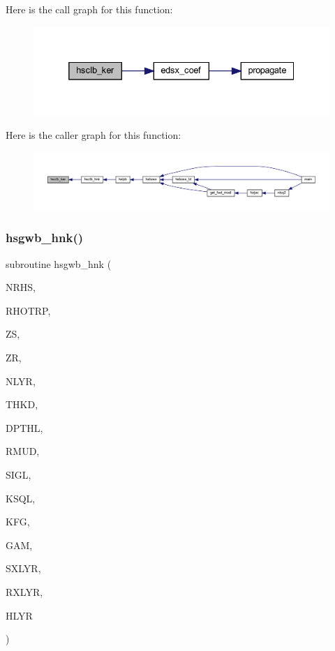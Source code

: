 Here is the call graph for this function\+:\nopagebreak
\begin{figure}[H]
\begin{center}
\leavevmode
\includegraphics[width=332pt]{Leroi_8f90_ab053f1c7997499ed6fca932a2f8cbecb_cgraph}
\end{center}
\end{figure}
Here is the caller graph for this function\+:\nopagebreak
\begin{figure}[H]
\begin{center}
\leavevmode
\includegraphics[width=350pt]{Leroi_8f90_ab053f1c7997499ed6fca932a2f8cbecb_icgraph}
\end{center}
\end{figure}
\mbox{\label{Leroi_8f90_a8e78b7efe3dc41645eaf9123100f4fc1}} 
\subsubsection{\texorpdfstring{hsgwb\+\_\+hnk()}{hsgwb\_hnk()}}
{\footnotesize\ttfamily subroutine hsgwb\+\_\+hnk (\begin{DoxyParamCaption}\item[{integer}]{N\+R\+HS,  }\item[{real, dimension(nrhs)}]{R\+H\+O\+T\+RP,  }\item[{real(kind=ql)}]{ZS,  }\item[{real(kind=ql)}]{ZR,  }\item[{integer}]{N\+L\+YR,  }\item[{real(kind=ql), dimension (nlyr)}]{T\+H\+KD,  }\item[{real(kind=ql), dimension (nlyr)}]{D\+P\+T\+HL,  }\item[{real(kind=ql), dimension(0\+:nlyr)}]{R\+M\+UD,  }\item[{complex(kind=ql), dimension (nlyr)}]{S\+I\+GL,  }\item[{complex(kind=ql), dimension (nlyr)}]{K\+S\+QL,  }\item[{integer}]{K\+FG,  }\item[{integer}]{G\+AM,  }\item[{integer}]{S\+X\+L\+YR,  }\item[{integer}]{R\+X\+L\+YR,  }\item[{complex, dimension(nrhs,3)}]{H\+L\+YR }\end{DoxyParamCaption})}

